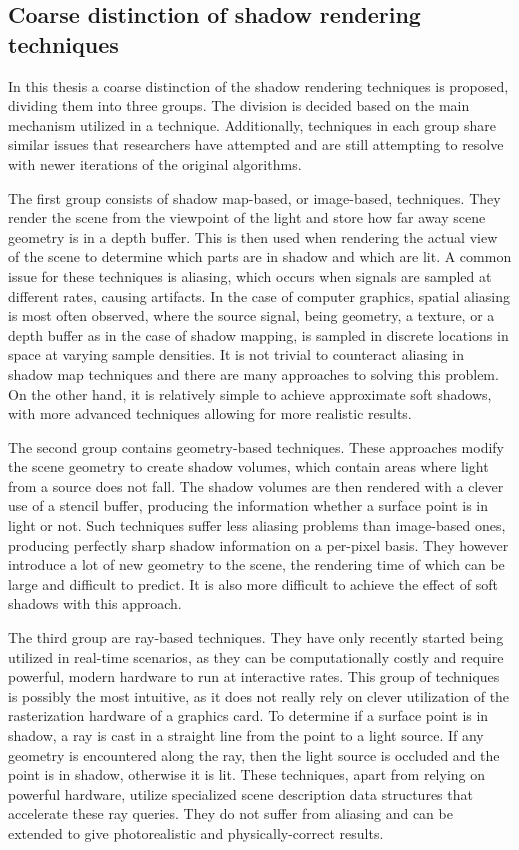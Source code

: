 \subsection{Coarse distinction of shadow rendering techniques}

In this thesis a coarse distinction of the shadow rendering techniques is proposed, dividing them into three groups. The division is decided based on the main mechanism utilized in a technique. Additionally, techniques in each group share similar issues that researchers have attempted and are still attempting to resolve with newer iterations of the original algorithms.

The first group consists of shadow map-based, or image-based, techniques. They render the scene from the viewpoint of the light and store how far away scene geometry is in a depth buffer. This is then used when rendering the actual view of the scene to determine which parts are in shadow and which are lit. A common issue for these techniques is aliasing, which occurs when signals are sampled at different rates, causing artifacts. In the case of computer graphics, spatial aliasing is most often observed, where the source signal, being geometry, a texture, or a depth buffer as in the case of shadow mapping, is sampled in discrete locations in space at varying sample densities. It is not trivial to counteract aliasing in shadow map techniques and there are many approaches to solving this problem. On the other hand, it is relatively simple to achieve approximate soft shadows, with more advanced techniques allowing for more realistic results.

The second group contains geometry-based techniques. These approaches modify the scene geometry to create shadow volumes, which contain areas where light from a source does not fall. The shadow volumes are then rendered with a clever use of a stencil buffer, producing the information whether a surface point is in light or not. Such techniques suffer less aliasing problems than image-based ones, producing perfectly sharp shadow information on a per-pixel basis. They however introduce a lot of new geometry to the scene, the rendering time of which can be large and difficult to predict. It is also more difficult to achieve the effect of soft shadows with this approach.

The third group are ray-based techniques. They have only recently started being utilized in real-time scenarios, as they can be computationally costly and require powerful, modern hardware to run at interactive rates. This group of techniques is possibly the most intuitive, as it does not really rely on clever utilization of the rasterization hardware of a graphics card. To determine if a surface point is in shadow, a ray is cast in a straight line from the point to a light source. If any geometry is encountered along the ray, then the light source is occluded and the point is in shadow, otherwise it is lit. These techniques, apart from relying on powerful hardware, utilize specialized scene description data structures that accelerate these ray queries. They do not suffer from aliasing and can be extended to give photorealistic and physically-correct results.

